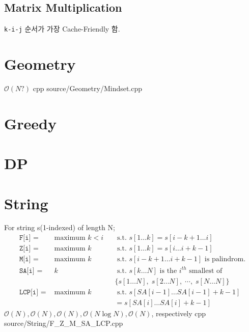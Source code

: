 \documentclass[portrait, 8pt, a4paper, oneside, twocolumn]{extarticle}
\begin{document}
\subsection{Matrix Multiplication}
\texttt{k-i-j} 순서가 가장 Cache-Friendly 함.

\section{Geometry}

{}
{$\mathcal O(N?)$}
{cpp}
{source/Geometry/Mindset.cpp}

\section{Greedy}


\section{DP}


\section{String}

{For string s(1-indexed) of length N;
\begin{align*}
\texttt{F[i] = }& \text{maximum } k<i && \text{ s.t. }  s[1\dots k] = s[i-k+1 \dots i]\\
\texttt{Z[i] = }& \text{maximum } k && \text{ s.t. }  s[1\dots k] = s[i \dots i+k-1]\\
\texttt{M[i] = }& \text{maximum } k && \text{ s.t. }  s[i-k+1 \dots i+k-1] \text{ is palindrom.}\\
\texttt{SA[i] = }& k && \text{ s.t. }  s[k\dots N] \text{ is the } i^{th} \text{ smallest of } \\
& && \{s[1\dots N],\; s[2\dots N],\; \cdots,\; s[N\dots N]\}\\
\texttt{LCP[i] = }& \text{maximum } k && \text{ s.t. } s[SA[i-1]\dots SA[i-1]+k-1]\\
& && = s[SA[i] \dots SA[i]+k-1]
\end{align*}
}
{$\mathcal O(N),\mathcal O(N),\mathcal O(N),\mathcal O(N\log N),\mathcal O(N)$, respectively}
{cpp}
{source/String/F_Z_M_SA_LCP.cpp}
\end{document}
